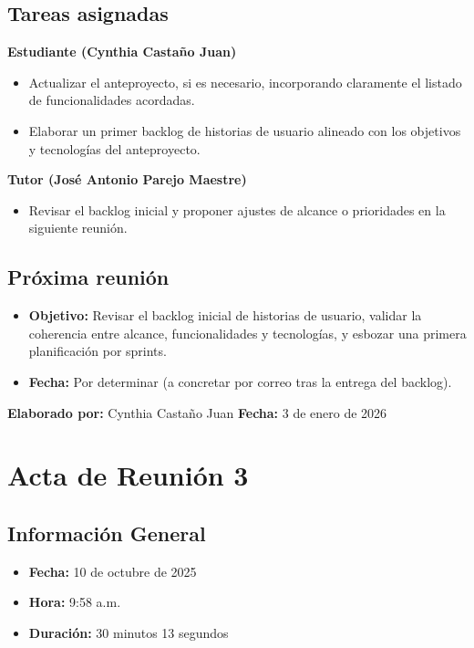 \subsection*{Tareas asignadas}

\textbf{Estudiante (Cynthia Castaño Juan)}
\begin{itemize}
    \item Actualizar el anteproyecto, si es necesario, incorporando claramente el listado de funcionalidades acordadas.
    \item Elaborar un primer backlog de historias de usuario alineado con los objetivos y tecnologías del anteproyecto.
\end{itemize}

\textbf{Tutor (José Antonio Parejo Maestre)}
\begin{itemize}
    \item Revisar el backlog inicial y proponer ajustes de alcance o prioridades en la siguiente reunión.
\end{itemize}

\subsection*{Próxima reunión}
\begin{itemize}
    \item \textbf{Objetivo:} Revisar el backlog inicial de historias de usuario, validar la coherencia entre alcance, funcionalidades y tecnologías, y esbozar una primera planificación por sprints.
    \item \textbf{Fecha:} Por determinar (a concretar por correo tras la entrega del backlog).
\end{itemize}

\textbf{Elaborado por:} Cynthia Castaño Juan \hfill \textbf{Fecha:} 3 de enero de 2026

\newpage

\section*{Acta de Reunión 3}

\subsection*{Información General}
\begin{itemize}
    \item \textbf{Fecha:} 10 de octubre de 2025
    \item \textbf{Hora:} 9:58 a.m.
    \item \textbf{Duración:} 30 minutos 13 segundos
\end{itemize}

